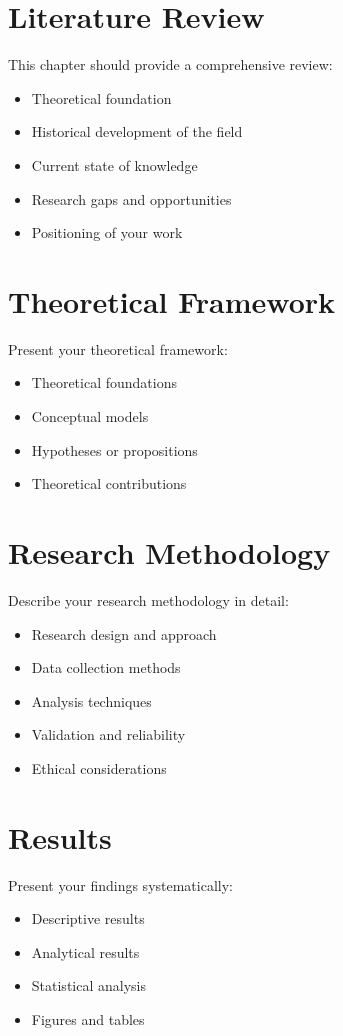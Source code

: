 \documentclass[12pt]{report}
\begin{document}
\chapter{Literature Review}
This chapter should provide a comprehensive review:
\begin{itemize}
    \item Theoretical foundation
    \item Historical development of the field
    \item Current state of knowledge
    \item Research gaps and opportunities
    \item Positioning of your work
\end{itemize}

\chapter{Theoretical Framework}
Present your theoretical framework:
\begin{itemize}
    \item Theoretical foundations
    \item Conceptual models
    \item Hypotheses or propositions
    \item Theoretical contributions
\end{itemize}

\chapter{Research Methodology}
Describe your research methodology in detail:
\begin{itemize}
    \item Research design and approach
    \item Data collection methods
    \item Analysis techniques
    \item Validation and reliability
    \item Ethical considerations
\end{itemize}

\chapter{Results}
Present your findings systematically:
\begin{itemize}
    \item Descriptive results
    \item Analytical results
    \item Statistical analysis
    \item Figures and tables
\end{itemize}
\end{document}
